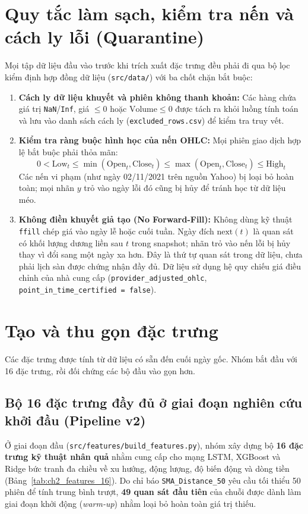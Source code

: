 \documentclass[12pt,a4paper]{report}
\begin{document}
\section{Quy tắc làm sạch, kiểm tra nến và cách ly lỗi (Quarantine)}
Mọi tập dữ liệu đầu vào trước khi trích xuất đặc trưng đều phải đi qua bộ lọc kiểm định hợp đồng dữ liệu (\texttt{src/data/}) với ba chốt chặn bắt buộc:
\begin{enumerate}
    \item \textbf{Cách ly dữ liệu khuyết và phiên không thanh khoản:} Các hàng chứa giá trị \texttt{NaN}/\texttt{Inf}, giá $\le 0$ hoặc $\text{Volume} \le 0$ được tách ra khỏi luồng tính toán và lưu vào danh sách cách ly (\nolinkurl{excluded_rows.csv}) để kiểm tra truy vết.
    \item \textbf{Kiểm tra ràng buộc hình học của nến OHLC:} Mọi phiên giao dịch hợp lệ bắt buộc phải thỏa mãn:
    \begin{equation}
        0 < \text{Low}_t \le \min(\text{Open}_t, \text{Close}_t) \le \max(\text{Open}_t, \text{Close}_t) \le \text{High}_t
    \end{equation}
    Các nến vi phạm (như ngày 02/11/2021 trên nguồn Yahoo) bị loại bỏ hoàn toàn; mọi nhãn $y$ trỏ vào ngày lỗi đó cũng bị hủy để tránh học từ dữ liệu méo.
    \item \textbf{Không điền khuyết giả tạo (No Forward-Fill):} Không dùng kỹ thuật \texttt{ffill} chép giá vào ngày lễ hoặc cuối tuần. Ngày đích $\text{next}(t)$ là quan sát có khối lượng dương liền sau $t$ trong snapshot; nhãn trỏ vào nến lỗi bị hủy thay vì đổi sang một ngày xa hơn. Đây là thứ tự quan sát trong dữ liệu, chưa phải lịch sàn được chứng nhận đầy đủ. Dữ liệu sử dụng hệ quy chiếu giá điều chỉnh của nhà cung cấp (\nolinkurl{provider_adjusted_ohlc}, \texttt{point\_in\_time\_certified = false}).
\end{enumerate}

\section{Tạo và thu gọn đặc trưng}
Các đặc trưng được tính từ dữ liệu có sẵn đến cuối ngày gốc. Nhóm bắt đầu với 16 đặc trưng, rồi đối chứng các bộ đầu vào gọn hơn.

\subsection{Bộ 16 đặc trưng đầy đủ ở giai đoạn nghiên cứu khởi đầu (Pipeline v2)}
Ở giai đoạn đầu (\nolinkurl{src/features/build_features.py}), nhóm xây dựng bộ \textbf{16 đặc trưng kỹ thuật nhân quả} nhằm cung cấp cho mạng LSTM, XGBoost và Ridge bức tranh đa chiều về xu hướng, động lượng, độ biến động và dòng tiền (Bảng~\ref{tab:ch2_features_16}). Do chỉ báo \nolinkurl{SMA_Distance_50} yêu cầu tối thiểu 50 phiên để tính trung bình trượt, \textbf{49 quan sát đầu tiên} của chuỗi được dành làm giai đoạn khởi động (\textit{warm-up}) nhằm loại bỏ hoàn toàn giá trị thiếu.
\end{document}
